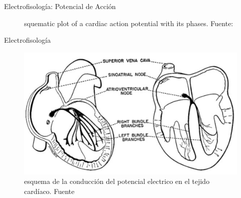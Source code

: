 \documentclass[11pt,spanish]{beamer}
\begin{document}
\begin{frame}{Electrofisología: Potencial de Acción}
\begin{figure}[H]
\centering
\def\svgwidth{9 cm}

\caption{squematic plot of a cardiac action potential with its phases. Fuente: \cite{action-potential-figure}} \label{action-potential}
\end{figure}
\end{frame}

\begin{frame}{Electrofisología}
\begin{figure}[H] %
\centering
\includegraphics[height = 6 cm]{fig/fundamentals-sistema_de_conduccion}
\caption{esquema de la conducción del potencial electrico en el tejido cardíaco. Fuente \cite{electrofis}} \label{corazon_conduccion}
\end{figure}
\end{frame}
\end{document}

